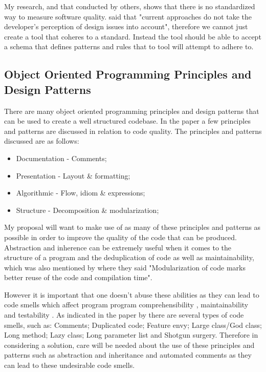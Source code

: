 My research, and that conducted by others, shows that there is no standardized way to measure software quality. \cite{10.1145/3428029.3428047, 10.1145/2674683.2674702} said that "current approaches do not take the developer's perception of design issues into account", therefore we cannot just create a tool that coheres to a standard. Instead the tool should be able to accept a schema that defines patterns and rules that to tool will attempt to adhere to.

\subsection{Object Oriented Programming Principles and Design Patterns}

There are many object oriented programming principles and design patterns that can be used to create a well structured codebase. In the paper \cite{10.1145/3428029.3428047} a few principles and patterns are discussed in relation to code quality. The principles and patterns discussed are as follows:
\begin{itemize}
	\item Documentation - Comments;
	\item Presentation - Layout \& formatting;
	\item Algorithmic - Flow, idiom \& expressions;
	\item Structure - Decomposition \& modularization;
\end{itemize}

My proposal will want to make use of as many of these principles and patterns as possible in order to improve the quality of the code that can be produced. Abstraction and inherence can be extremely useful when it comes to the structure of a program and the deduplication of code as well as maintainability, which was also mentioned by \cite{8681007} where they said "Modularization of code marks better reuse of the code and compilation time".

However it is important that one doesn't abuse these abilities as they can lead to code smells which affect program program comprehensibility \citep{8681007, ImpactOfAntipatterns}, maintainability \citep{8681007, ImpactOfAntipatterns2, CodeSmellsAndMaintainability} and testability \citep{8681007, TestCasesAndCodeQuality}. As indicated in the paper by \cite{10.1145/3555228.3555268} there are several types of code smells, such as: Comments; Duplicated code; Feature envy; Large class/God class; Long method; Lazy class; Long parameter list and Shotgun surgery. Therefore in considering a solution, care will be needed about the use of these principles and patterns such as abstraction and inheritance and automated comments as they can lead to these undesirable code smells.

